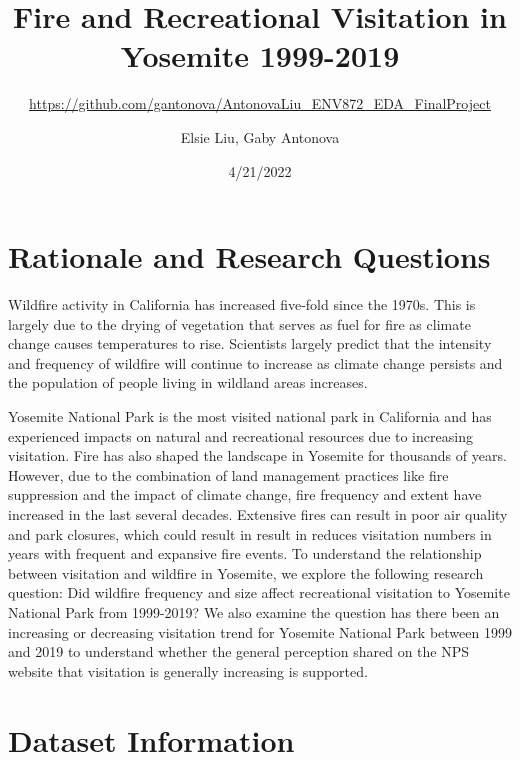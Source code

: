 \documentclass[
  12pt,
]{article}
\title{Fire and Recreational Visitation in Yosemite 1999-2019}
\subtitle{\url{https://github.com/gantonova/AntonovaLiu_ENV872_EDA_FinalProject}}
\author{Elsie Liu, Gaby Antonova}
\date{4/21/2022}
\begin{document}
\maketitle

{
\hypersetup{linkcolor=}
\setcounter{tocdepth}{2}
\tableofcontents
}
\newpage
\listoftables 
\newpage
\listoffigures 
\newpage

\hypertarget{rationale-and-research-questions}{%
\section{Rationale and Research Questions}\label{rationale-and-research-questions}}

Wildfire activity in California has increased five-fold since the 1970s. This is largely due to the drying of vegetation that serves as fuel for fire as climate change causes temperatures to rise. Scientists largely predict that the intensity and frequency of wildfire will continue to increase as climate change persists and the population of people living in wildland areas increases.

Yosemite National Park is the most visited national park in California and has experienced impacts on natural and recreational resources due to increasing visitation. Fire has also shaped the landscape in Yosemite for thousands of years. However, due to the combination of land management practices like fire suppression and the impact of climate change, fire frequency and extent have increased in the last several decades. Extensive fires can result in poor air quality and park closures, which could result in result in reduces visitation numbers in years with frequent and expansive fire events. To understand the relationship between visitation and wildfire in Yosemite, we explore the following research question: Did wildfire frequency and size affect recreational visitation to Yosemite National Park from 1999-2019? We also examine the question has there been an increasing or decreasing visitation trend for Yosemite National Park between 1999 and 2019 to understand whether the general perception shared on the NPS website that visitation is generally increasing is supported.

\newpage

\hypertarget{dataset-information}{%
\section{Dataset Information}\label{dataset-information}}
\end{document}
